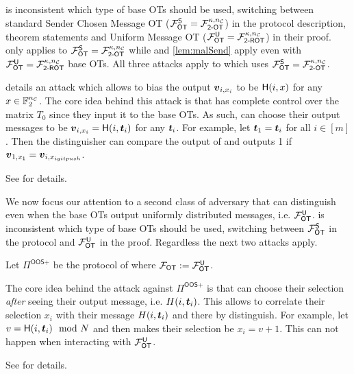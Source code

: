 \iffullversion
\begin{remark}\label{remark:oosROT}
	\cite{RSA:OrrOrsSch17} is inconsistent which type of base OTs should be used, switching between standard Sender Chosen Message OT ($\OOT^\send=\mathcal{F}^{\kappa,\nc}_{\textsf{2-OT}}$) in the protocol description, theorem statements and Uniform Message OT ($\OOT^\U=\mathcal{F}^{\kappa,\nc}_{\textsf{2-ROT}}$) in their proof.  only applies to $\OOT^\send=\mathcal{F}^{\kappa,\nc}_{\textsf{2-OT}}$ while  and \ref{lem:malSend} apply even with $\OOT^\U=\mathcal{F}^{\kappa,\nc}_{\textsf{2-ROT}}$ base OTs. All three attacks apply to \cite{C:KelOrsSch15} which uses $\OOT^\send=\mathcal{F}^{\kappa,\nc}_{\textsf{2-OT}}$.
\end{remark}
\fi


 details an attack which allows \R to bias the output $\vv_{i,x_i}$ to be $\H(i,x)$ for any $x\in\mathbb{F}^{\nc}_2$. The core idea behind this attack is that \rec has complete control over the matrix $T_0$ since they input it to the base OTs. As such, \rec can choose their output messages to be $\vv_{i,x_i}=\H(i,\tt_i)$ for any $\tt_i$. For example, let $\tt_1=\tt_{i}$ for all $i\in[m]$. Then the distinguisher can compare the output of \send and  outputs 1 if $\vv_{1,x_1}=\vv_{i,x_{igit push}}$. 
\iffullversion

\else
See  for details.
\fi




We now focus our attention to a second class of adversary that can distinguish even when the base OTs output uniformly distributed messages, i.e. $\OOT^\U$. \cite{RSA:OrrOrsSch17} is inconsistent which type of base OTs should be used, switching between $\OOT^\send$ in the protocol and $\OOT^\U$ in the proof. Regardless the next two attacks apply. 
\begin{definition}\label{def:OOS2}
	Let $\Pi^{\textsf{OOS+}}$ be the protocol of  where $\OOT:=\OOT^\U$.
\end{definition}
The core idea behind the  attack against $\Pi^{\textsf{OOS+}}$ is that \rec can choose their selection \emph{after} seeing their output message, i.e. $H(i,\tt_i)$. This allows \rec to correlate their selection $x_i$ with their message $H(i,\tt_i)$ and there by distinguish. For example, let $v=\H(i,\tt_i)\mod N$ and then \rec makes their selection be $x_i=v+1$. This can not happen when interacting with $\OOT^\U$. 
\iffullversion

\else
See  for details.
\fi




